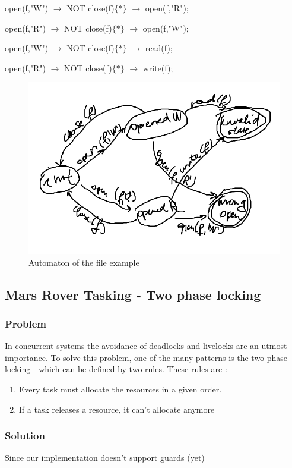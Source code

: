				open(f,"W") $\rightarrow$ NOT close(f)$\{\ast\}$ $\rightarrow$ open(f,"R");
				
				open(f,"R") $\rightarrow$ NOT close(f)$\{\ast\}$ $\rightarrow$ open(f,"W");
				
				open(f,"W") $\rightarrow$ NOT close(f)$\{\ast\}$ $\rightarrow$ read(f);
				
				open(f,"R") $\rightarrow$ NOT close(f)$\{\ast\}$ $\rightarrow$ write(f);
				
				\begin{figure}[h]
				\centering
				\includegraphics[width=0.5\linewidth]{include/figures/chapter_5/fileautomaton}
				\caption{Automaton of the file example}
				\label{fig:cep:fileautomaton}
				\end{figure}

		
		
		\subsection{Mars Rover Tasking - Two phase locking}
			\subsubsection{Problem}
				In concurrent systems the avoidance of deadlocks and livelocks are an utmost importance.
				To solve this problem, one of the many patterns is  the two phase locking - which can be defined by two rules.
				These rules are : 
				\begin{enumerate}
					\item{Every task must allocate the resources in a given order.}
					\item{If a task releases a resource, it can't allocate anymore}
				\end{enumerate}
			\subsubsection{Solution}
				Since our implementation doesn't support guards (yet) 

